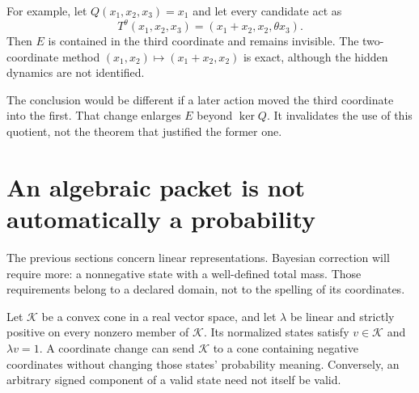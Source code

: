 \documentclass[11pt,oneside,openany]{book}
\theoremstyle{definition}\newtheorem{definition}[theorem]{Definition}
\begin{document}
For example, let $Q(x_1,x_2,x_3)=x_1$ and let every candidate act as
\[
T^\theta(x_1,x_2,x_3)=(x_1+x_2,x_2,\theta x_3).
\]
Then $E$ is contained in the third coordinate and remains invisible. The two-coordinate method $(x_1,x_2)\mapsto(x_1+x_2,x_2)$ is exact, although the hidden dynamics are not identified.

The conclusion would be different if a later action moved the third coordinate into the first. That change enlarges $E$ beyond $\ker Q$. It invalidates the use of this quotient, not the theorem that justified the former one.


\section{An algebraic packet is not automatically a probability}
The previous sections concern linear representations. Bayesian correction will require more: a nonnegative state with a well-defined total mass. Those requirements belong to a declared domain, not to the spelling of its coordinates.

Let $\mathcal K$ be a convex cone in a real vector space, and let $\lambda$ be linear and strictly positive on every nonzero member of $\mathcal K$. Its normalized states satisfy $v\in\mathcal K$ and $\lambda v=1$. A coordinate change can send $\mathcal K$ to a cone containing negative coordinates without changing those states' probability meaning. Conversely, an arbitrary signed component of a valid state need not itself be valid.
\end{document}

